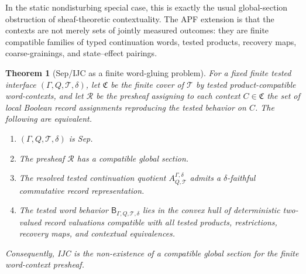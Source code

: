 \documentclass[11pt]{article}
\newtheorem{theorem}{Theorem}[section]
\begin{document}
In the static nondisturbing special case, this is exactly the usual
global-section obstruction of sheaf-theoretic contextuality.  The APF
extension is that the contexts are not merely sets of jointly
measured outcomes: they are finite compatible families of typed
continuation words, tested products, recovery maps, coarse-grainings,
and state--effect pairings.

\begin{theorem}[Sep/IJC as a finite word-gluing problem]\label{thm:sep-ijc-word-gluing}
For a fixed finite tested interface $(\Gamma,Q,\mathcal T,\delta)$,
let $\mathfrak C$ be the finite cover of $\mathcal T$ by tested
product-compatible word-contexts, and let $\mathcal R$ be the
presheaf assigning to each context $C\in\mathfrak C$ the set of local
Boolean record assignments reproducing the tested behavior on $C$.
The following are equivalent.
\begin{enumerate}[label=(\arabic*),leftmargin=2em]
\item $(\Gamma,Q,\mathcal T,\delta)$ is Sep.
\item The presheaf $\mathcal R$ has a compatible global section.
\item The resolved tested continuation quotient
$A^{\Gamma,\delta}_{Q,\mathcal T}$ admits a $\delta$-faithful
commutative record representation.
\item The tested word behavior
$\mathsf B_{\Gamma,Q,\mathcal T,\delta}$ lies in the convex hull of
deterministic two-valued record valuations compatible with all
tested products, restrictions, recovery maps, and contextual
equivalences.
\end{enumerate}
Consequently, IJC is the non-existence of a compatible global
section for the finite word-context presheaf.
\end{theorem}
\end{document}
